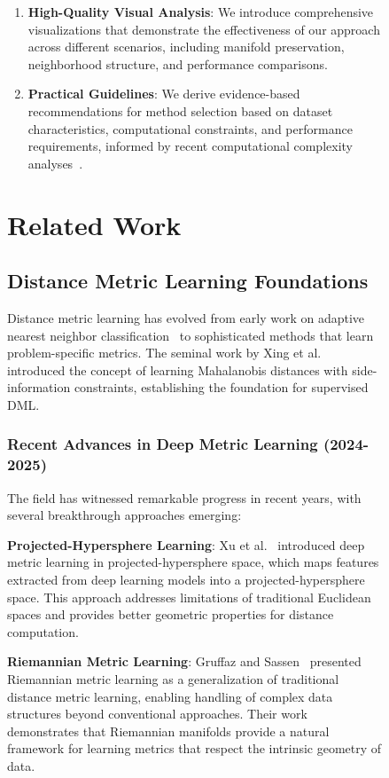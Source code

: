 \documentclass[review]{elsarticle}
\begin{document}
\begin{figure}[htbp]
\begin{enumerate}
\item \textbf{High-Quality Visual Analysis}: We introduce comprehensive visualizations that demonstrate the effectiveness of our approach across different scenarios, including manifold preservation, neighborhood structure, and performance comparisons.

\item \textbf{Practical Guidelines}: We derive evidence-based recommendations for method selection based on dataset characteristics, computational constraints, and performance requirements, informed by recent computational complexity analyses~\cite{kokkonen2025metric}.
\end{enumerate}

\section{Related Work}
\label{sec:related}

\subsection{Distance Metric Learning Foundations}

Distance metric learning has evolved from early work on adaptive nearest neighbor classification~\cite{cover1967nearest} to sophisticated methods that learn problem-specific metrics. The seminal work by Xing et al.~\cite{xing2002distance} introduced the concept of learning Mahalanobis distances with side-information constraints, establishing the foundation for supervised DML.

\subsubsection{Recent Advances in Deep Metric Learning (2024-2025)}

The field has witnessed remarkable progress in recent years, with several breakthrough approaches emerging:

\textbf{Projected-Hypersphere Learning}: Xu et al.~\cite{xu2025deep} introduced deep metric learning in projected-hypersphere space, which maps features extracted from deep learning models into a projected-hypersphere space. This approach addresses limitations of traditional Euclidean spaces and provides better geometric properties for distance computation.

\textbf{Riemannian Metric Learning}: Gruffaz and Sassen~\cite{gruffaz2025riemannian} presented Riemannian metric learning as a generalization of traditional distance metric learning, enabling handling of complex data structures beyond conventional approaches. Their work demonstrates that Riemannian manifolds provide a natural framework for learning metrics that respect the intrinsic geometry of data.


\end{figure}
\end{document}
